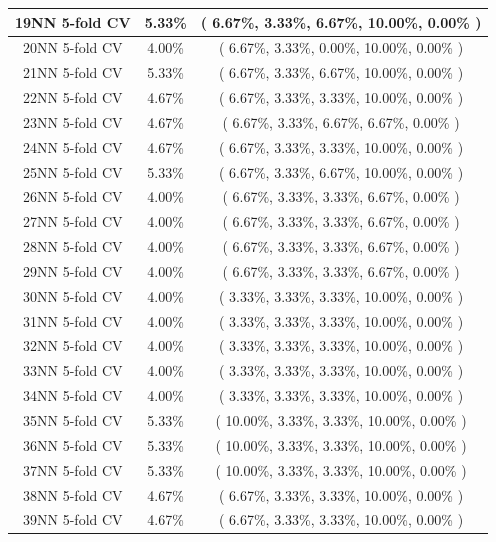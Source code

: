 \documentclass[11pt,a4paper]{article}
\begin{document}
\begin{center}
\begin{tabular} {|| c | c | c ||}
        19NN 5-fold CV & 5.33\% & ( 6.67\%, 3.33\%, 6.67\%, 10.00\%, 0.00\% ) \\ \hline
        20NN 5-fold CV & 4.00\% & ( 6.67\%, 3.33\%, 0.00\%, 10.00\%, 0.00\% ) \\ \hline
        21NN 5-fold CV & 5.33\% & ( 6.67\%, 3.33\%, 6.67\%, 10.00\%, 0.00\% ) \\ \hline
        22NN 5-fold CV & 4.67\% & ( 6.67\%, 3.33\%, 3.33\%, 10.00\%, 0.00\% ) \\ \hline
        23NN 5-fold CV & 4.67\% & ( 6.67\%, 3.33\%, 6.67\%, 6.67\%, 0.00\% ) \\ \hline
        24NN 5-fold CV & 4.67\% & ( 6.67\%, 3.33\%, 3.33\%, 10.00\%, 0.00\% ) \\ \hline
        25NN 5-fold CV & 5.33\% & ( 6.67\%, 3.33\%, 6.67\%, 10.00\%, 0.00\% ) \\ \hline
        26NN 5-fold CV & 4.00\% & ( 6.67\%, 3.33\%, 3.33\%, 6.67\%, 0.00\% ) \\ \hline
        27NN 5-fold CV & 4.00\% & ( 6.67\%, 3.33\%, 3.33\%, 6.67\%, 0.00\% ) \\ \hline
        28NN 5-fold CV & 4.00\% & ( 6.67\%, 3.33\%, 3.33\%, 6.67\%, 0.00\% ) \\ \hline
        29NN 5-fold CV & 4.00\% & ( 6.67\%, 3.33\%, 3.33\%, 6.67\%, 0.00\% ) \\ \hline
        30NN 5-fold CV & 4.00\% & ( 3.33\%, 3.33\%, 3.33\%, 10.00\%, 0.00\% ) \\ \hline
        31NN 5-fold CV & 4.00\% & ( 3.33\%, 3.33\%, 3.33\%, 10.00\%, 0.00\% ) \\ \hline
        32NN 5-fold CV & 4.00\% & ( 3.33\%, 3.33\%, 3.33\%, 10.00\%, 0.00\% ) \\ \hline
        33NN 5-fold CV & 4.00\% & ( 3.33\%, 3.33\%, 3.33\%, 10.00\%, 0.00\% ) \\ \hline
        34NN 5-fold CV & 4.00\% & ( 3.33\%, 3.33\%, 3.33\%, 10.00\%, 0.00\% ) \\ \hline
        35NN 5-fold CV & 5.33\% & ( 10.00\%, 3.33\%, 3.33\%, 10.00\%, 0.00\% ) \\ \hline
        36NN 5-fold CV & 5.33\% & ( 10.00\%, 3.33\%, 3.33\%, 10.00\%, 0.00\% ) \\ \hline
        37NN 5-fold CV & 5.33\% & ( 10.00\%, 3.33\%, 3.33\%, 10.00\%, 0.00\% ) \\ \hline
        38NN 5-fold CV & 4.67\% & ( 6.67\%, 3.33\%, 3.33\%, 10.00\%, 0.00\% ) \\ \hline
        39NN 5-fold CV & 4.67\% & ( 6.67\%, 3.33\%, 3.33\%, 10.00\%, 0.00\% ) \\ \hline
    \end{tabular}
\end{center}
\newpage
\hypertarget{tenFoldResult}{}
\end{document}

